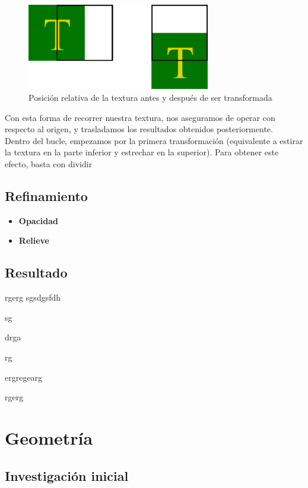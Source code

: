 \begin{figure}[h]
	\centering
	\includegraphics[width=8cm]{archivos/desplazamiento}
	\caption{Posición relativa de la textura antes y después de ser transformada}
	\label{fig:desplazamiento}
\end{figure}

Con esta forma de recorrer nuestra textura, nos aseguramos de operar con respecto al origen, y trasladamos los resultados obtenidos posteriormente.\\

Dentro del bucle, empezamos por la primera transformación (equivalente a estirar la textura en la parte inferior y estrechar en la superior). Para obtener este efecto, basta con dividir 

\subsection{Refinamiento}

\begin{itemize}
	\item \textbf{Opacidad}
	\item \textbf{Relieve}
\end{itemize}

\subsection{Resultado}

rgerg
sgsdgsfdh

sg

drga

rg

ergregearg

rgerg


\section{Geometría}


\subsection{Investigación inicial}

